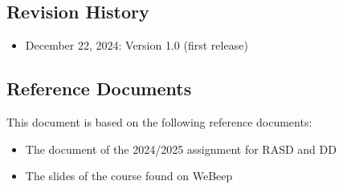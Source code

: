 
\subsection{Revision History}
    \begin{itemize}
        \item {December 22, 2024: Version 1.0 (first release)}
    \end{itemize}


\subsection{Reference Documents}
    This document is based on the following reference documents:
    \begin{itemize}
        \item {The document of the 2024/2025 assignment for RASD and DD }
        \item {The slides of the course found on WeBeep}
    \end{itemize}


